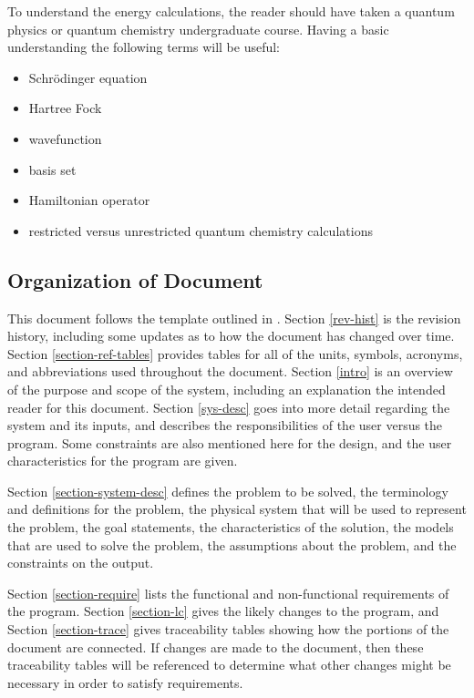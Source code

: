 \documentclass[12pt]{article}
\begin{document}
To understand the energy calculations, the reader should have taken a quantum 
physics or quantum chemistry undergraduate course. Having a basic understanding 
the following terms will be useful:
\begin{itemize}
	\item Schr\"{o}dinger equation
	\item Hartree Fock
	\item wavefunction
	\item basis set
	\item Hamiltonian operator
	\item restricted versus unrestricted quantum chemistry calculations
\end{itemize}

\subsection{Organization of Document}

This document follows the template outlined in \citet{SmithAndLai2005, 
SmithEtAl2007}. Section 
\ref{rev-hist} is the revision history, including some updates as to how the 
document has changed over time. Section \ref{section-ref-tables} 
provides tables for all of the units, symbols, acronyms, and 
abbreviations used throughout the document. Section \ref{intro} is an overview 
of the purpose and scope of the system, including an 
explanation the intended 
reader for this document. Section \ref{sys-desc} goes into more detail 
regarding the system and its inputs, and describes the responsibilities of the 
user versus the program. Some constraints are also mentioned here for the 
design, and the user characteristics for the program are given. 

Section \ref{section-system-desc} defines the problem to be solved, the 
terminology and definitions for the problem, the physical system that will be 
used to represent the problem, the goal statements, the characteristics of the 
solution, the models that are used to solve the problem, the assumptions about 
the problem, and the constraints on the output.

Section \ref{section-require} lists the functional and non-functional 
requirements of the program. Section \ref{section-lc} gives the likely changes 
to the program, and Section \ref{section-trace} gives traceability tables 
showing how the portions of the document are connected. If changes are made to 
the document, then these traceability tables will be referenced to determine 
what other changes might be necessary in order to satisfy requirements.
\end{document}
